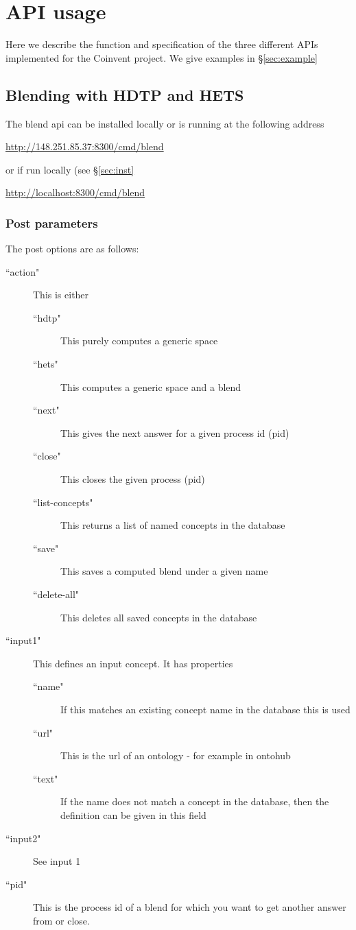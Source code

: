 \section{API usage}

Here we describe the function and specification of the three different APIs implemented for the Coinvent project. We give examples in \S\ref{sec:example}

\subsection{Blending with HDTP and HETS}



The blend api can be installed locally or is running at the following address
\begin{center}
\url{http://148.251.85.37:8300/cmd/blend}
\end{center}
\noindent or if run locally (see \S\ref{sec:inst}
\begin{center}
\url{http://localhost:8300/cmd/blend}
\end{center}

\subsubsection{Post parameters}

The post options are as follows:
\begin{description}
\item[``action"]This is either
\begin{description}
\item[``hdtp"] This purely computes a generic space
\item[``hets"] This computes a generic space and a blend
\item[``next"] This gives the next answer for a given process id (pid)
\item[``close"] This closes the given process (pid)
\item[``list-concepts"] This returns a list of named concepts in the database
\item[``save"] This saves a computed blend under a given name
\item[``delete-all"] This deletes all saved concepts in the database
\end{description}
\item[``input1"] This defines an input concept. It has properties
\begin{description}
\item[``name"]  If this matches an existing concept name in the database this is used
\item[``url"]  This is the url of an ontology - for example in ontohub
\item[``text"]  If the name does not match a concept in the database, then the definition can be given in this field
\end{description}
\item[``input2"] See input 1
\item[``pid"] This is the process id of a blend for which you want to get another answer from or close.
\end{description}

